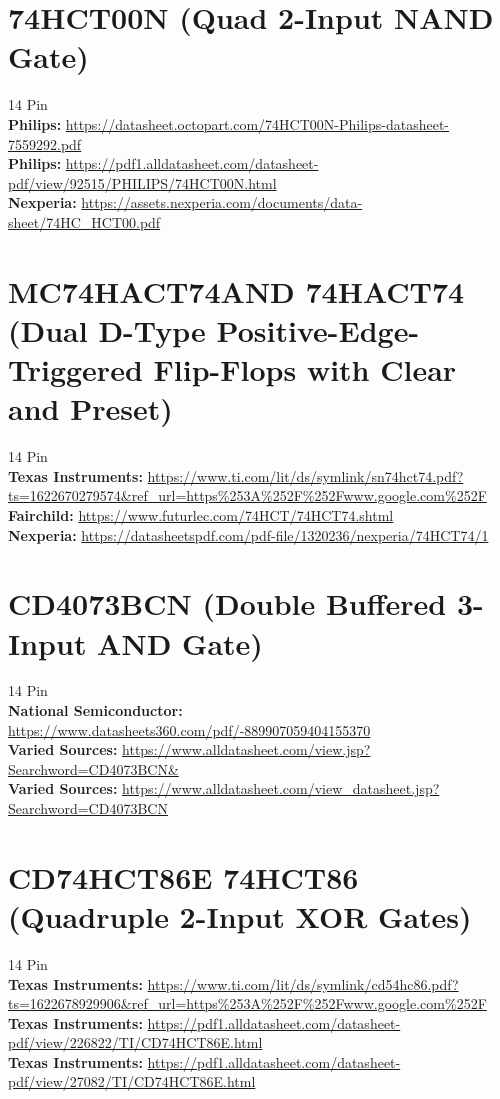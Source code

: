 \documentclass[10pt, letterpaper]{article}
\begin{document}
\section{74HCT00N (Quad 2-Input NAND Gate)}
14 Pin\\
\textbf{Philips: } \url{https://datasheet.octopart.com/74HCT00N-Philips-datasheet-7559292.pdf}\\
\textbf{Philips: } \url{https://pdf1.alldatasheet.com/datasheet-pdf/view/92515/PHILIPS/74HCT00N.html}\\
\textbf{Nexperia: } \url{https://assets.nexperia.com/documents/data-sheet/74HC_HCT00.pdf}

\section{MC74HACT74AND \textbar 74HACT74 (Dual D-Type Positive-Edge-Triggered Flip-Flops with Clear and Preset)}
14 Pin\\
\textbf{Texas Instruments: } \url{https://www.ti.com/lit/ds/symlink/sn74hct74.pdf?ts=1622670279574&ref_url=https%253A%252F%252Fwww.google.com%252F}\\
\textbf{Fairchild: } \url{https://www.futurlec.com/74HCT/74HCT74.shtml}\\
\textbf{Nexperia: } \url{https://datasheetspdf.com/pdf-file/1320236/nexperia/74HCT74/1}

\section{CD4073BCN (Double Buffered 3-Input AND Gate)}
14 Pin\\
\textbf{National Semiconductor: } \url{https://www.datasheets360.com/pdf/-889907059404155370}\\
\textbf{Varied Sources: } \url{https://www.alldatasheet.com/view.jsp?Searchword=CD4073BCN&}\\
\textbf{Varied Sources: } \url{https://www.alldatasheet.com/view_datasheet.jsp?Searchword=CD4073BCN}

\section{CD74HCT86E \textbar 74HCT86 (Quadruple 2-Input XOR Gates)}
14 Pin\\
\textbf{Texas Instruments: } \url{https://www.ti.com/lit/ds/symlink/cd54hc86.pdf?ts=1622678929906&ref_url=https%253A%252F%252Fwww.google.com%252F}\\
\textbf{Texas Instruments: } \url{https://pdf1.alldatasheet.com/datasheet-pdf/view/226822/TI/CD74HCT86E.html}\\
\textbf{Texas Instruments: } \url{https://pdf1.alldatasheet.com/datasheet-pdf/view/27082/TI/CD74HCT86E.html}
\end{document}
